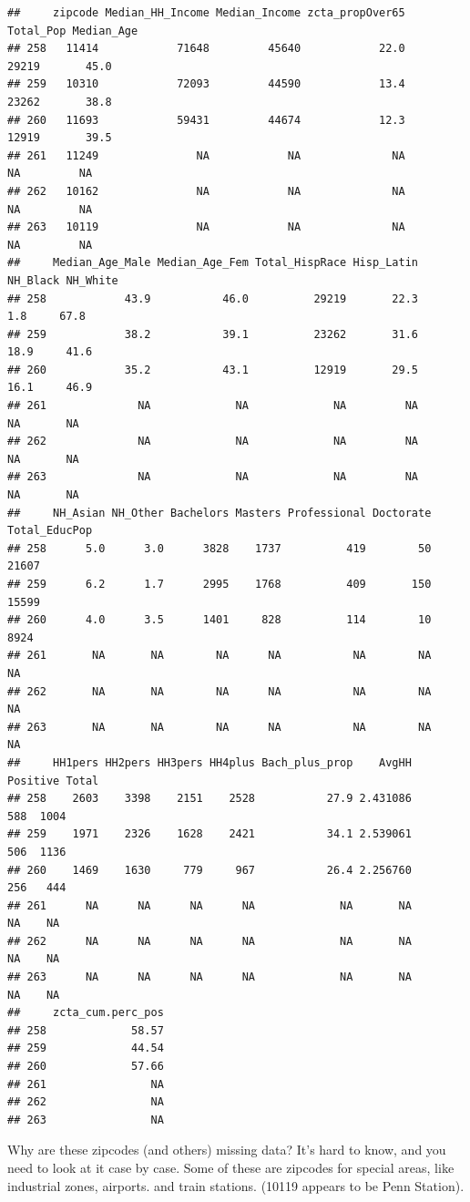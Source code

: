 \documentclass[
  openany]{book}
\begin{document}
\begin{verbatim}
##     zipcode Median_HH_Income Median_Income zcta_propOver65 Total_Pop Median_Age
## 258   11414            71648         45640            22.0     29219       45.0
## 259   10310            72093         44590            13.4     23262       38.8
## 260   11693            59431         44674            12.3     12919       39.5
## 261   11249               NA            NA              NA        NA         NA
## 262   10162               NA            NA              NA        NA         NA
## 263   10119               NA            NA              NA        NA         NA
##     Median_Age_Male Median_Age_Fem Total_HispRace Hisp_Latin NH_Black NH_White
## 258            43.9           46.0          29219       22.3      1.8     67.8
## 259            38.2           39.1          23262       31.6     18.9     41.6
## 260            35.2           43.1          12919       29.5     16.1     46.9
## 261              NA             NA             NA         NA       NA       NA
## 262              NA             NA             NA         NA       NA       NA
## 263              NA             NA             NA         NA       NA       NA
##     NH_Asian NH_Other Bachelors Masters Professional Doctorate Total_EducPop
## 258      5.0      3.0      3828    1737          419        50         21607
## 259      6.2      1.7      2995    1768          409       150         15599
## 260      4.0      3.5      1401     828          114        10          8924
## 261       NA       NA        NA      NA           NA        NA            NA
## 262       NA       NA        NA      NA           NA        NA            NA
## 263       NA       NA        NA      NA           NA        NA            NA
##     HH1pers HH2pers HH3pers HH4plus Bach_plus_prop    AvgHH Positive Total
## 258    2603    3398    2151    2528           27.9 2.431086      588  1004
## 259    1971    2326    1628    2421           34.1 2.539061      506  1136
## 260    1469    1630     779     967           26.4 2.256760      256   444
## 261      NA      NA      NA      NA             NA       NA       NA    NA
## 262      NA      NA      NA      NA             NA       NA       NA    NA
## 263      NA      NA      NA      NA             NA       NA       NA    NA
##     zcta_cum.perc_pos
## 258             58.57
## 259             44.54
## 260             57.66
## 261                NA
## 262                NA
## 263                NA
\end{verbatim}

Why are these zipcodes (and others) missing data? It's hard to know, and you need to look at it case by case. Some of these are zipcodes for special areas, like industrial zones, airports. and train stations. (10119 appears to be Penn Station).
\end{document}
